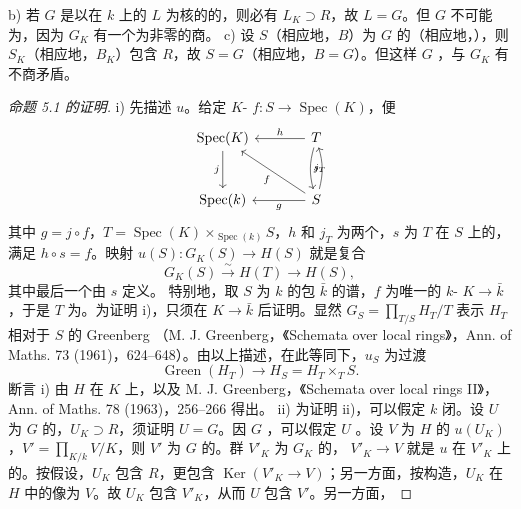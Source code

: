 b) 若 $G$ 是以在 $k$ 上的 $L$ 为核的的，则必有 $L_K\supset R$，故 $L=G$。但 $G$ 不可能为，因为 $G_K$ 有一个为非零的商。
c) 设 $S$（相应地，$B$）为 $G$ 的（相应地，），则 $S_K$（相应地，$B_K$）包含 $R$，故 $S=G$（相应地，$B=G$）。但这样 $G$ ，与 $G_K$ 有不商矛盾。
\begin{proof}[命题 5.1 的证明]
i) 先描述 $u$。给定 $K$- $f:S\to\operatorname{Spec}(K)$，便
\[
\begin{tikzcd}[row sep=large,column sep=large]
\operatorname{Spec}(K)\arrow[d,"j"']&T\arrow[l,"h"']\arrow[d,"j_T",bend right=15]\\
\operatorname{Spec}(k)&S\arrow[l,"g"]\arrow[ul,"f"]\arrow[u,"s",bend right=15]
\end{tikzcd}
\]
其中 $g=j\circ f$，$T=\operatorname{Spec}(K)\times_{\operatorname{Spec}(k)}S$，$h$ 和 $j_T$ 为两个，$s$ 为 $T$ 在 $S$ 上的，满足 $h\circ s=f$。映射 $u(S):G_K(S)\to H(S)$ 就是复合
\[G_K(S)\xrightarrow{\sim}H(T)\longrightarrow H(S),\]
其中最后一个由 $s$ 定义。
特别地，取 $S$ 为 $k$ 的包 $\bar k$ 的谱，$f$ 为唯一的 $k$- $K\to\bar k$，于是 $T$ 为。为证明 i)，只须在 $K\to\bar k$ 后证明。显然 $G_S=\prod_{T/S}H_T/T$ 表示 $H_T$ 相对于 $S$ 的 Greenberg （M. J. Greenberg，《Schemata over local rings》，Ann. of Maths. 73 (1961)，624--648）。由以上描述，在此等同下，$u_S$ 为过渡
\[\operatorname{Green}(H_T)\longrightarrow H_S=H_T\times_TS.\]
断言 i) 由 $H$ 在 $K$ 上，以及 M. J. Greenberg，《Schemata over local rings II》，Ann. of Maths. 78 (1963)，256--266 得出。
ii) 为证明 ii)，可以假定 $k$ 闭。设 $U$ 为 $G$ 的，$U_K\supset R$，须证明 $U=G$。因 $G$ ，可以假定 $U$ 。设 $V$ 为 $H$ 的 $u(U_K)$，$V'=\prod_{K/k}V/K$，则 $V'$ 为 $G$ 的。群 $V'_K$ 为 $G_K$ 的， $V'_K\to V$ 就是 $u$ 在 $V'_K$ 上的。按假设，$U_K$ 包含 $R$，更包含 $\operatorname{Ker}(V'_K\to V)$；另一方面，按构造，$U_K$ 在 $H$ 中的像为 $V$。故 $U_K$ 包含 $V'_K$，从而 $U$ 包含 $V'$。另一方面，

\end{proof}
